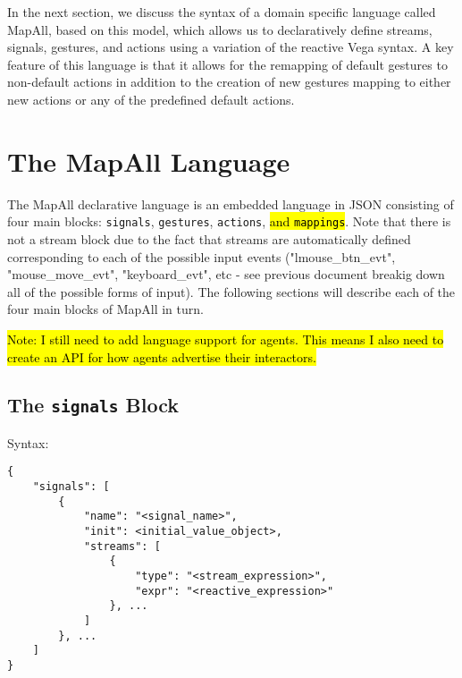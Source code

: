\documentclass{article}
\begin{document}
In the next section, we discuss the syntax of a domain specific language called MapAll, based on this model, which allows us to declaratively define streams, signals, gestures, and actions using a variation of the reactive Vega syntax.
A key feature of this language is that it allows for the remapping of default gestures to non-default actions in addition to the creation of new gestures mapping to either new actions or any of the predefined default actions.


\section{The MapAll Language}

The MapAll declarative language is an embedded language in JSON consisting of four main blocks: \texttt{signals}, \texttt{gestures}, \texttt{actions}, \hl{and \texttt{mappings}}.
Note that there is not a stream block due to the fact that streams are automatically defined corresponding to each of the possible input events ("lmouse\_btn\_evt", "mouse\_move\_evt", "keyboard\_evt", etc - see previous document breakig down all of the possible forms of input). The following sections will describe each of the four main blocks of MapAll in turn.

\hl{Note: I still need to add language support for agents.
This means I also need to create an API for how agents advertise their interactors.}

\subsection{The \texttt{signals} Block}
Syntax:

\begin{Verbatim}[baselinestretch=1.0]
{
    "signals": [
        {
            "name": "<signal_name>",
            "init": <initial_value_object>,
            "streams": [
                {
                    "type": "<stream_expression>",
                    "expr": "<reactive_expression>"
                }, ...
            ]
        }, ...
    ]
}
\end{Verbatim}
\end{document}
